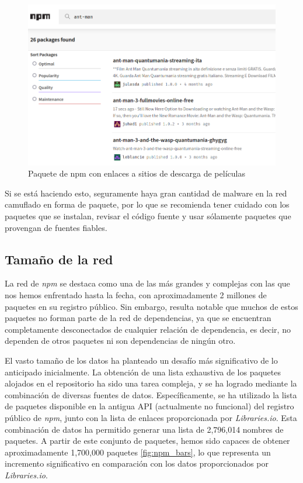 \begin{figure}[ht!]
    \begin{center}
        \includegraphics[width=1\textwidth]{img/npm/antman.png}
        \caption{Paquete de npm con enlaces a sitios de descarga de películas}
    \end{center}
    \label{fig:antman}
\end{figure}

Si se está haciendo esto, seguramente haya gran cantidad de malware en la red camuflado en forma de paquete,
por lo que se recomienda tener cuidado con los paquetes que se instalan, revisar el código fuente y usar
sólamente paquetes que provengan de fuentes fiables.

\subsection{Tamaño de la red}

La red de \textit{npm} se destaca como una de las más grandes y complejas con las que nos hemos
enfrentado hasta la fecha, con aproximadamente 2 millones de paquetes en su registro público.
Sin embargo, resulta notable que muchos de estos paquetes no forman parte de la red de dependencias,
ya que se encuentran completamente desconectados de cualquier relación de dependencia, es decir,
no dependen de otros paquetes ni son dependencias de ningún otro.

El vasto tamaño de los datos ha planteado un desafío más significativo de lo anticipado
inicialmente. La obtención de una lista exhaustiva de los paquetes alojados en el repositorio
ha sido una tarea compleja, y se ha logrado mediante la combinación de diversas fuentes de datos.
Específicamente, se ha utilizado la lista de paquetes disponible en la antigua
API (actualmente no funcional) del registro público de \textit{npm}, junto con la lista de
enlaces proporcionada por \textit{Libraries.io}. Esta combinación de datos ha permitido
generar una lista de 2,796,014 nombres de paquetes. A partir de este conjunto de paquetes,
hemos sido capaces de obtener aproximadamente 1,700,000 paquetes \ref{fig:npm_bars}, lo que representa un incremento
significativo en comparación con los datos proporcionados por \textit{Libraries.io}.

